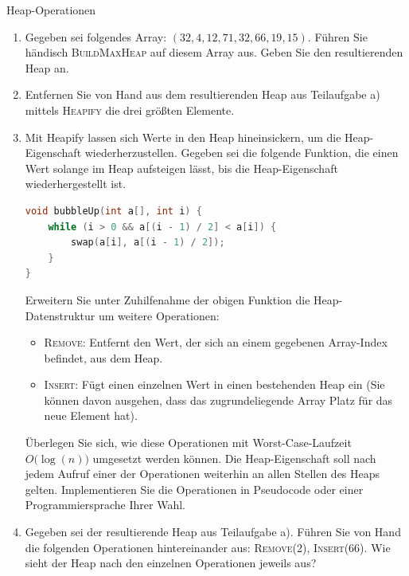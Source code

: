 \documentclass[11pt,a4paper]{article}
\begin{document}
\thispagestyle{empty}





\begin{aufgabe}{1}{Heap-Operationen}
    \begin{enumerate}[label=\alph*)]
        \item \label{it:ex} Gegeben sei folgendes Array: $(32, 4, 12, 71, 32, 66, 19, 15)$. Führen Sie händisch \textsc{BuildMaxHeap} auf diesem Array aus.
        Geben Sie den resultierenden Heap an.
        \item Entfernen Sie von Hand aus dem resultierenden Heap aus Teilaufgabe a) mittels \textsc{Heapify} die drei größten Elemente.
        \item Mit Heapify lassen sich Werte in den Heap hineinsickern, um die Heap-Eigenschaft wiederherzustellen.
        Gegeben sei die folgende Funktion, die einen Wert solange im Heap aufsteigen lässt, bis die Heap-Eigenschaft wiederhergestellt ist.
        \begin{lstlisting}[language=c++]
void bubbleUp(int a[], int i) {
    while (i > 0 && a[(i - 1) / 2] < a[i]) {
        swap(a[i], a[(i - 1) / 2]);
    }
}
        \end{lstlisting}
        Erweitern Sie unter Zuhilfenahme der obigen Funktion die Heap-Datenstruktur um weitere Operationen:
        \begin{itemize}
            \item \textsc{Remove}: Entfernt den Wert, der sich an einem gegebenen Array-Index befindet, aus dem Heap.
            \item \textsc{Insert}: Fügt einen einzelnen Wert in einen bestehenden Heap ein (Sie können davon ausgehen, dass das zugrundeliegende Array Platz für das neue Element hat).
        \end{itemize}
        Überlegen Sie sich, wie diese Operationen mit Worst-Case-Laufzeit $O\big(\log(n)\big)$ umgesetzt werden können.
        Die Heap-Eigenschaft soll nach jedem Aufruf einer der Operationen weiterhin an allen Stellen des Heaps gelten.
        Implementieren Sie die Operationen in Pseudocode oder einer Programmiersprache Ihrer Wahl.
        \item Gegeben sei der resultierende Heap aus Teilaufgabe a).
        Führen Sie von Hand die folgenden Operationen hintereinander aus: \textsc{Remove(2)}, \textsc{Insert(66)}.
        Wie sieht der Heap nach den einzelnen Operationen jeweils aus?
    \end{enumerate}
\end{aufgabe}
\end{document}
